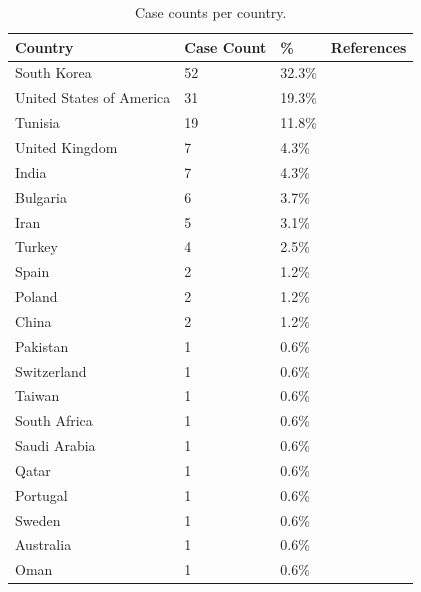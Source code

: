 
\begin{table}[!t]
\caption{Case counts per country.}
\label{tab:case_country_counts}
\centering
\renewcommand{\arraystretch}{1.2}
\begin{tabular}{p{3cm} p{3cm} p{3cm} p{3cm}}
\toprule
\textbf{Country} & \textbf{Case Count} & \textbf{\%} & \textbf{References} \\
\midrule
South Korea & 52 & 32.3\% & \cite{Lee_2007} \\
United States of America & 31 & 19.3\% & \cite{Alao_2006i, Ataya_2013, Bhumi_2024f, Fry_2010, Guinan_2019f, Hardy_2023g, Jehangir_2019h, Karp_1991b, Kerestes_2019, Kumar_2001, Liu_2005, Tammana_2012j, Tay_2004} \\
Tunisia & 19 & 11.8\% & \cite{Elghali_2016} \\
United Kingdom & 7 & 4.3\% & \cite{Beecroft_1998, Berry_2021e, Cauchi_2002, Cox_2007, Gardner_2017h, Qureshi_2016} \\
India & 7 & 4.3\% & \cite{Bhasin_2014, Bhattacharjee_2008, Kar_2015, Kariholu_2008, Kumar_2019f, Misra_2013, Wadhwa_2015e} \\
Bulgaria & 6 & 3.7\% & \cite{Losanoff_1996, Losanoff_1997e} \\
Iran & 5 & 3.1\% & \cite{DivsalarP._2023a, Emamhadi_2018, Farhadi_2024h} \\
Turkey & 4 & 2.5\% & \cite{Akay_2015f, Atayan_2016, Tanrikulu_2015e, Yildiz_2016e} \\
Spain & 2 & 1.2\% & \cite{CamachoDorado_2018, fjbuilsRepeatedBehaviorDeliberate2024} \\
Poland & 2 & 1.2\% & \cite{Kobiela_2015, Wnęk_2015f} \\
China & 2 & 1.2\% & \cite{Jin_2023, Li_2013} \\
Pakistan & 1 & 0.6\% & \cite{Yasin_2009} \\
Switzerland & 1 & 0.6\% & \cite{Wildhaber_2005} \\
Taiwan & 1 & 0.6\% & \cite{Chang_2017f} \\
South Africa & 1 & 0.6\% & \cite{Sobnach_2011f} \\
Saudi Arabia & 1 & 0.6\% & \cite{Sultan_2024f} \\
Qatar & 1 & 0.6\% & \cite{Ali_2017} \\
Portugal & 1 & 0.6\% & \cite{Peixoto_2017f} \\
Sweden & 1 & 0.6\% & \cite{Naji_2012f} \\
Australia & 1 & 0.6\% & \cite{Apikotoa_2022f} \\
Oman & 1 & 0.6\% & \cite{AlShaaibi_2021b} \\

\end{tabular}
\end{table}

